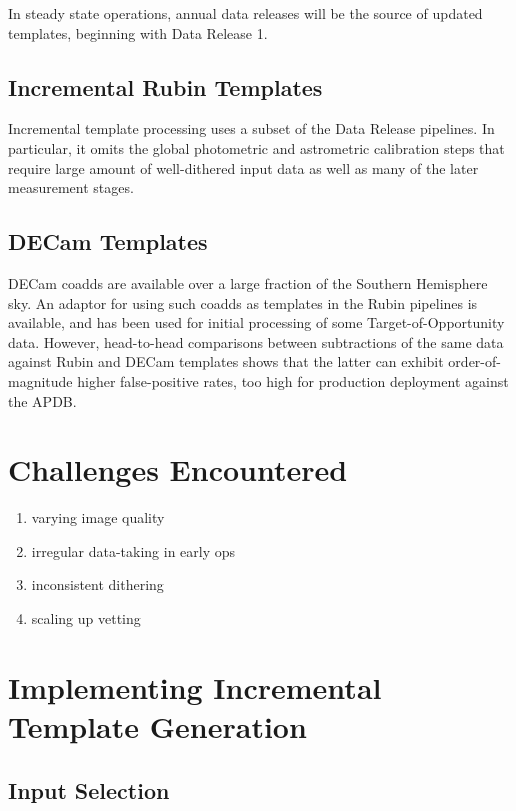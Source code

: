 \documentclass[DM,lsstdraft,authoryear,toc]{lsstdoc}
\begin{document}
In steady state operations, annual data releases will be the source of updated templates, beginning with Data Release 1.

\subsection{Incremental Rubin Templates} \label{sec:incremental}

Incremental template processing uses a subset of the Data Release pipelines.
In particular, it omits the global photometric and astrometric calibration steps that require large amount of well-dithered input data as well as many of the later measurement stages.

\subsection{DECam Templates} \label{sec:decam}

DECam coadds are available over a large fraction of the Southern Hemisphere sky.
An adaptor for using such coadds as templates in the Rubin pipelines is available, and has been used for initial processing of some Target-of-Opportunity data.
However, head-to-head comparisons between subtractions of the same data against Rubin and DECam templates shows that the latter can exhibit order-of-magnitude higher false-positive rates, too high for production deployment against the APDB.



\section{Challenges Encountered} \label{sec:challenges}

\begin{enumerate}
\item varying image quality
\item irregular data-taking in early ops
\item inconsistent dithering
\item scaling up vetting
\end{enumerate}


\section{Implementing Incremental Template Generation} \label{sec:implementation}

\subsection{Input Selection}
\end{document}
